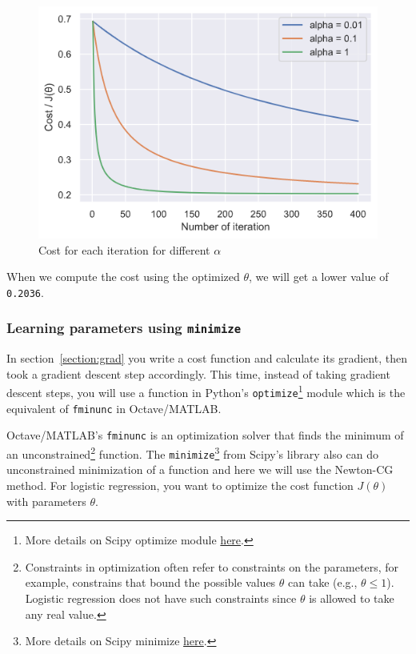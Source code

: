 \documentclass[12pt]{article}
\begin{document}
\begin{figure}[h!]
  \centering
  \includegraphics[scale=0.6]{gradientdescent.png}
  \caption{Cost for each iteration for different $\alpha$}
  \label{fig:gradientdescent}
\end{figure}

When we compute the cost using the optimized $\theta$, we will get a lower value of \texttt{0.2036}.

\subsubsection{Learning parameters using \texttt{minimize}} \label{chap:min}

In section~\ref{section:grad} you write a cost function and calculate its gradient, then took a gradient descent step accordingly. This time, instead of taking gradient descent steps, you will use a function in Python's \texttt{optimize}\footnote{More details on Scipy optimize module \href{https://docs.scipy.org/doc/scipy/reference/optimize.html}{here}.} module which is the equivalent of \texttt{fminunc} in Octave/MATLAB.

Octave/MATLAB's \texttt{fminunc} is an optimization solver that finds the minimum of an unconstrained\footnote{Constraints in optimization often refer to constraints on the parameters, for example, constrains that bound the possible values $\theta$ can take (e.g., $\theta\leq 1$). Logistic regression does not have such constraints since $\theta$ is allowed to take any real value.} function. The \texttt{minimize}\footnote{More details on Scipy minimize \href{https://docs.scipy.org/doc/scipy/reference/generated/scipy.optimize.minimize.html#scipy-optimize-minimize}{here}.} from Scipy's library also can do unconstrained minimization of a function and here we will use the Newton-CG method. For logistic regression, you want to optimize the cost function $J(\theta)$ with parameters $\theta$. 
\end{document}

